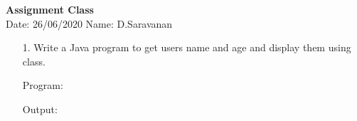 \documentclass[a4paper,11pt,openright]{report}
\begin{document}
\singlespacing
\pagestyle{plain}

\begin{center}
\textbf{Assignment Class} \\
Date: 26/06/2020 \hspace{2mm} Name: D.Saravanan
\end{center}

\vspace{10px}

\begin{enumerate}

\item[1.] Write a Java program to get  users name and age and display them using class.

\vspace{0.5cm}

Program:


\vspace{0.5cm}

Output:


\end{enumerate}
\end{document}
